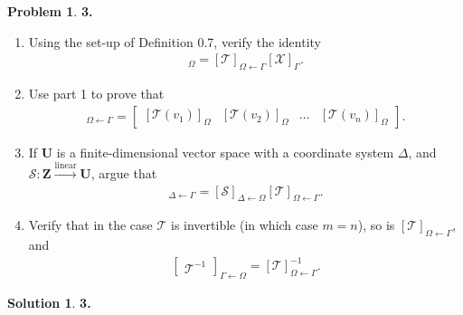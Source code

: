 \documentclass{book}
\theoremstyle{definition}
\newtheorem*{prob*}{Problem}
\newtheorem*{sln*}{Solution}
\newcommand{\Z}{\mathbf{Z}}
\newcommand{\U}{\mathbf{U}}
\begin{document}
\newpage



\begin{prob*}\textbf{3.}
	\begin{enumerate}
		\item Using the set-up of Definition 0.7, verify the identity
		\begin{align*}
		[\mathcal{T(X)}]_\Omega = [\mathcal{T}]_{\Omega \leftarrow \Gamma}[\mathcal{X}]_\Gamma.
		\end{align*}
		
		
		
		\item Use part 1 to prove that 
		\begin{align*}
		[\mathcal{T}]_{\Omega\leftarrow\Gamma} = \begin{bmatrix}
		[\mathcal{T}(v_1)]_\Omega & [\mathcal{T}(v_2)]_\Omega & \dots & [\mathcal{T}(v_n)]_\Omega  
		\end{bmatrix}.
		\end{align*}
		
		
		
		\item If $\U$ is a finite-dimensional vector space with a coordinate system $\Delta$, and $\mathcal{S} : \Z \overset{\text{linear}}{\longrightarrow} \U$, argue that 
		\begin{align*}
		[\mathcal{S}\circ \mathcal{T}]_{\Delta \leftarrow \Gamma} = [\mathcal{S}]_{\Delta \leftarrow \Omega}[\mathcal{T}]_{\Omega\leftarrow\Gamma}.
		\end{align*}
		
		
		\item Verify that in the case $\mathcal{T}$ is invertible (in which case $m=n$), so is $[\mathcal{T}]_{\Omega\leftarrow \Gamma}$, and 
		\begin{align*}
		\begin{bmatrix}
		\mathcal{T}^{-1}
		\end{bmatrix}_{\Gamma\leftarrow\Omega} = [\mathcal{T}]^{-1}_{\Omega\leftarrow \Gamma}.
		\end{align*}
	\end{enumerate}

	
	
	
	\begin{sln*}\textbf{3.}
		\begin{enumerate}
			

\end{enumerate}
\end{sln*}
\end{prob*}
\end{document}
